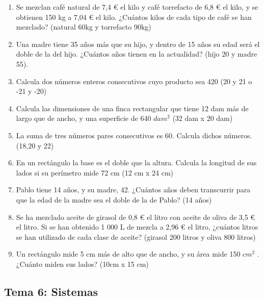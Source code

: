 \documentclass[a4paper,12pt]{article}
\begin{document}
\begin{enumerate}
\begin{enumerate}
                    \item Se mezclan café natural de 7,4 € el kilo y café torrefacto de 6,8 € el kilo, y se obtienen 150 kg a 7,04 € el kilo. ¿Cuántos kilos de cada tipo de café se han mezclado? (natural 60kg y torrefacto 90kg)
                    \item Una madre tiene 35 años más que su hijo, y dentro de 15 años su edad será el doble de la del hijo. ¿Cuántos años tienen en la actualidad? (hijo 20  y madre 55).
                    \item  Calcula dos números enteros consecutivos cuyo producto sea 420 (20 y 21 o -21 y -20)
                    \item  Calcula las dimensiones de una finca rectangular que tiene 12 dam más de largo que de ancho, y una superficie de 640 $dam^2$ (32 dam x 20 dam)
                    \item  La suma de tres números pares consecutivos es 60. Calcula dichos números.(18,20 y 22)
                    \item En un rectángulo la base es el doble que la altura. Calcula la longitud de sus lados si su perímetro mide 72 cm (12 cm x 24 cm)
                    \item  Pablo tiene 14 años, y su madre, 42. ¿Cuántos años deben transcurrir para que la edad de la madre sea el doble de la de Pablo? (14 años)
                    \item Se ha mezclado aceite de girasol de 0,8 € el litro con aceite de oliva de 3,5 € el litro. Si se han obtenido 1 000 L de mezcla a 2,96 € el litro, ¿cuántos litros se han utilizado de cada clase de aceite? (girasol 200 litros y oliva 800 litros)
                    \item Un rectángulo mide 5 cm más de alto que de ancho,  y su área mide 150 $cm^2$ . ¿Cuánto miden sus lados? (10cm x 15 cm)
                \end{enumerate}
    \end{enumerate}
       
\subsection*{Tema 6: Sistemas}
    
\end{document}
